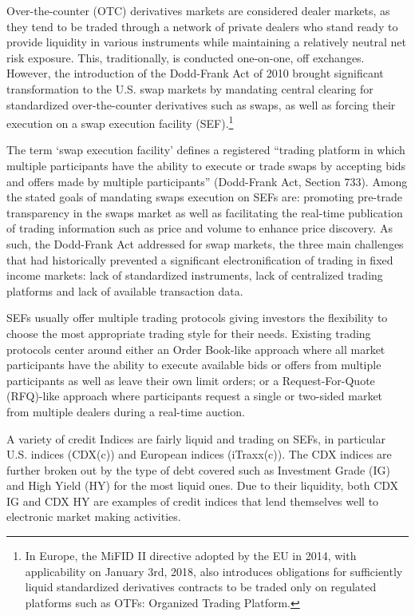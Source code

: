 Over-the-counter (OTC) derivatives markets are considered dealer markets, as they tend to be traded through a network of private dealers who stand ready to provide liquidity in various instruments while maintaining a relatively neutral net risk exposure. This, traditionally, is conducted one-on-one, off exchanges. However, the introduction of the Dodd-Frank Act of 2010 brought significant transformation to the U.S. swap markets by mandating central clearing for standardized over-the-counter derivatives such as swaps, as well as forcing their execution on a swap execution facility (SEF).\footnote{In Europe, the MiFID II directive adopted by the EU in 2014, with applicability on January 3rd, 2018, also introduces obligations for sufficiently liquid standardized derivatives contracts to be traded only on regulated platforms such as OTFs: Organized Trading Platform.}


The term `swap execution facility' defines a registered ``trading platform in which multiple participants have the ability to execute or trade swaps by accepting bids and offers made by multiple participants'' (Dodd-Frank Act, Section 733). Among the stated goals of mandating swaps execution on SEFs are: promoting pre-trade transparency in the swaps market as well as facilitating the real-time publication of trading information such as price and volume to enhance price discovery. As such, the Dodd-Frank Act addressed for swap markets, the three main challenges that had historically prevented a significant electronification of trading in fixed income markets: lack of standardized instruments, lack of centralized trading platforms and lack of available transaction data.


SEFs usually offer multiple trading protocols giving investors the flexibility to choose the most appropriate trading style for their needs. Existing trading protocols center around either an Order Book-like approach where all market participants have the ability to execute available bids or offers from multiple participants as well as leave their own limit orders; or a Request-For-Quote (RFQ)-like approach where participants request a single or two-sided market from multiple dealers during a real-time auction.


A variety of credit Indices are fairly liquid and trading on SEFs, in particular U.S. indices (CDX(c)) and European indices (iTraxx(c)). The CDX indices are further broken out by the type of debt covered such as Investment Grade (IG) and High Yield (HY) for the most liquid ones. Due to their liquidity, both CDX IG and CDX HY are examples of credit indices that lend themselves well to electronic market making activities.


